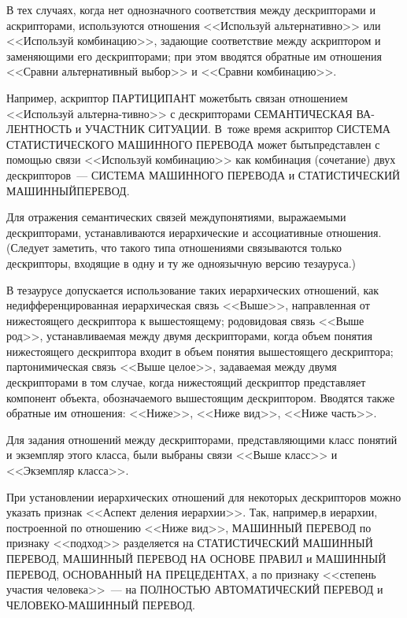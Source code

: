 \begin{multicols}{2}
  В тех случаях, когда нет однозначного соответствия между дескрипторами и 
аскрипторами, используются отношения <<Используй альтернативно>> или <<Используй 
комбинацию>>, задающие соответствие между аскриптором и заменяющими его 
дескрипторами; при этом вводятся обратные им отношения <<Сравни альтернативный 
выбор>> и <<Сравни комбинацию>>. 

Например, аскриптор ПАРТИЦИПАНТ может\linebreak быть 
связан отношением <<Используй альтерна-\linebreak тивно>> с дескрипторами СЕМАНТИЧЕСКАЯ 
ВА-\linebreak ЛЕНТНОСТЬ и УЧАСТНИК СИТУАЦИИ. В~то\linebreak же время аскриптор СИСТЕМА 
СТАТИСТИЧЕСКОГО МАШИННОГО ПЕРЕВОДА может быть\linebreak представлен с помощью 
связи <<Используй комбинацию>> как комбинация (сочетание) двух дескрипторов~--- 
СИСТЕМА МАШИННОГО ПЕРЕВОДА и СТАТИСТИЧЕСКИЙ МАШИННЫЙ\linebreak  ПЕРЕВОД.
{ %

}
  
  Для отражения семантических связей между\linebreak понятиями, выражаемыми дескрипторами, 
уста\-нав\-ли\-ва\-ют\-ся иерархические и ассоциативные отношения. (Следует заметить, что такого 
типа отношениями связываются только дескрипторы, входящие в одну и ту же одноязычную 
версию тезауруса.)
  
  В тезаурусе допускается использование таких иерархических отношений, как 
недифференцированная иерархическая связь <<Выше>>, направленная от нижестоящего 
дескриптора к вышестоящему; родовидовая связь <<Выше род>>, устанавливаемая между 
двумя дескрипторами, когда объем понятия нижестоящего дескриптора входит в объем 
понятия вышестоящего дескриптора; партонимическая связь <<Выше целое>>, задаваемая 
между двумя дескрипторами в том случае, когда нижестоящий дескриптор представляет 
компонент объекта, обозначаемого вышестоящим дескриптором. Вводятся также обратные 
им отношения: <<Ниже>>, <<Ниже вид>>, <<Ниже часть>>. 
  
  Для задания отношений между дескрипторами, представляющими класс понятий и 
экземпляр этого класса, были выбраны связи <<Выше класс>> и <<Экземпляр класса>>.
  
  При установлении иерархических отношений для некоторых дескрипторов можно указать 
признак <<Аспект деления иерархии>>. Так, например,\linebreak в иерархии, построенной по 
отношению <<\mbox{Ниже} вид>>, МАШИННЫЙ ПЕРЕВОД по признаку <<подход>> разделяется 
на СТАТИСТИЧЕСКИЙ МАШИННЫЙ ПЕРЕВОД, МАШИННЫЙ ПЕРЕВОД НА ОСНОВЕ 
ПРАВИЛ и МАШИННЫЙ ПЕРЕВОД, ОСНОВАННЫЙ НА ПРЕЦЕДЕНТАХ, а по признаку 
<<степень участия человека>>~--- на ПОЛНОСТЬЮ АВТОМАТИЧЕСКИЙ ПЕРЕВОД и 
ЧЕЛОВЕКО-МАШИННЫЙ ПЕРЕВОД.
  

\end{multicols}

